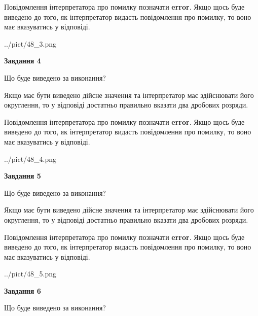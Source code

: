 \documentclass[12pt, ukrainian]{article}
\begin{document}
{\begin {Large}
Повідомлення інтерпретатора про помилку позначати \textbf{error}.
Якщо щось буде виведено до того, як інтерпретатор видасть повідомлення про помилку, 
то воно має вказуватись у відповіді. \par

\begin{center}
	{../pict/48_3.png}
\end{center}
\newpage

{\begin {center}\textbf{Завдання 4}\end {center}}\par
Що буде виведено за виконання? \par

Якщо має бути виведено дійсне значення та інтерпретатор має здійснювати його округлення, 
то у відповіді достатньо правильно вказати два дробових розряди.

Повідомлення інтерпретатора про помилку позначати \textbf{error}.
Якщо щось буде виведено до того, як інтерпретатор видасть повідомлення про помилку, 
то воно має вказуватись у відповіді. \par

\begin{center}
	{../pict/48_4.png}
\end{center}
\newpage

{\begin {center}\textbf{Завдання 5}\end {center}}\par
Що буде виведено за виконання? \par

Якщо має бути виведено дійсне значення та інтерпретатор має здійснювати його округлення, 
то у відповіді достатньо правильно вказати два дробових розряди.

Повідомлення інтерпретатора про помилку позначати \textbf{error}.
Якщо щось буде виведено до того, як інтерпретатор видасть повідомлення про помилку, 
то воно має вказуватись у відповіді. \par

\begin{center}
	{../pict/48_5.png}
\end{center}
\newpage

{\begin {center}\textbf{Завдання 6}\end {center}}\par
Що буде виведено за виконання? \par


\end{Large}}
\end{document}

